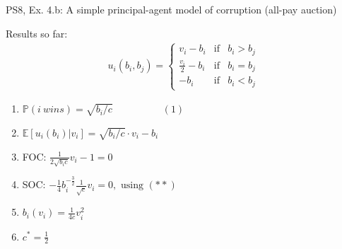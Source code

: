 \begin{frame}{PS8, Ex. 4.b: A simple principal-agent model of corruption (all-pay auction)}
\begin{multicols}{2}
\begin{itemize}
      \end{itemize}
      \vspace{-6pt}
      Results so far: \vspace{-6pt}
      \begin{align*}
        u_i(b_i,b_j)=\left\{\begin{array}{lcl}
          v_i-b_i           & \text{if} & b_i>b_j \\
          \frac{v_i}{2}-b_i & \text{if} & b_i=b_j \\
          -b_i              & \text{if} & b_i<b_j
        \end{array}\right.
      \end{align*} \vspace{-16pt}
      \begin{enumerate}
        \item $\mathbb{P}(i\ wins)=\sqrt{b_i/c}\quad\quad\quad\quad\quad(1)$
        \item $\mathbb{E}[u_i(b_i)|v_i]=\sqrt{b_i/c}\cdot v_i-b_i$
        \item FOC: $\frac{1}{2\sqrt{b_ic}}v_i-1=0$
        \item[] SOC: $-\frac{1}{4}b_i^{-\frac{3}{2}}\frac{1}{\sqrt{c}}v_i=0,\text{ using }(**)$
        \item $b_i(v_i)=\frac{1}{4c}v_i^2$
        \item $c^*=\frac{1}{2}$
      \end{enumerate}
      \vfill\null
    \end{multicols}
\end{frame}
